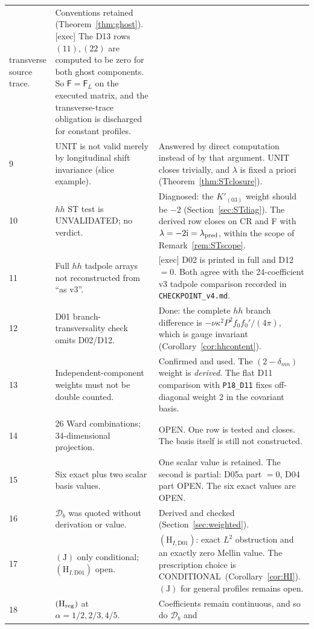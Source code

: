 \documentclass[11pt,a4paper]{article}
\newcommand{\ka}{\kappa}
\newcommand{\ii}{\mathrm i}
\newcommand{\Hreg}{(\mathrm H_{\rm reg})}
\newcommand{\Jcond}{(\mathrm J)}
\newcommand{\loc}[1]{\nolinkurl{#1}}
\newcommand{\OPEN}{\textsf{OPEN}}
\newcommand{\CONDITIONAL}{\textsf{CONDITIONAL}}
\newcommand{\UNVALIDATED}{\textsf{UNVALIDATED}}
\theoremstyle{plain}
\theoremstyle{definition}
\theoremstyle{remark}
\numberwithin{equation}{section}
\begin{document}
\begin{longtable}{@{}L{.035\linewidth}L{.36\linewidth}L{.54\linewidth}@{}}
transverse source trace. &
Conventions retained (Theorem~\ref{thm:ghost}).
\textsf{[exec]} The D13 rows \((11),(22)\) are computed to be zero
for both ghost components. So \(\mathsf F=\mathsf F_L\) on the
executed matrix, and the transverse-trace obligation is discharged
for constant profiles.\\
9 & UNIT is not valid merely by longitudinal shift invariance
(slice example). &
Answered by direct computation instead of by that argument.
UNIT closes trivially, and \(\lambda\) is fixed a priori
(Theorem~\ref{thm:STclosure}).\\
10 & \(hh\) ST test is \UNVALIDATED; no verdict. &
Diagnosed: the \(K'_{(03)}\) weight should be \(-2\)
(Section~\ref{sec:STdiag}).
The derived row closes on CR and F with
\(\lambda=-2\ii=\lambda_{\rm pred}\), within the scope of
Remark~\ref{rem:STscope}.\\
11 & Full \(hh\) tadpole arrays not reconstructed from
``as v3''. &
\textsf{[exec]} D02 is printed in full and D12 \(=0\).
Both agree with the 24-coefficient v3 tadpole comparison recorded in
\loc{CHECKPOINT_v4.md}.\\
12 & D01 branch-transversality check omits D02/D12. &
Done: the complete \(hh\) branch difference is
\(-\nu\ka^2P^2f_0f_0'/(4\pi)\), which is gauge invariant
(Corollary~\ref{cor:hhcontent}).\\
13 & Independent-component weights must not be double counted. &
Confirmed and used. The \((2-\delta_{mn})\) weight is
\emph{derived}.
The flat D11 comparison with \texttt{P18\_D11} fixes off-diagonal
weight 2 in the covariant basis.\\
14 & 26 Ward combinations; 34-dimensional projection. &
\OPEN. One row is tested and closes.
The basis itself is still not constructed.\\
15 & Six exact plus two scalar basis values. &
One scalar value is retained.
The second is partial: D05a part \(=0\), D04 part \OPEN.
The six exact values are \OPEN.\\
16 & \(\mathcal D_b\) was quoted without derivation or value. &
Derived and checked (Section~\ref{sec:weighted}).\\
17 & \(\Jcond\) only conditional; \((\mathrm H_{I,\mathrm{D01}})\)
open. &
\((\mathrm H_{I,\mathrm{D01}})\): exact \(L^2\) obstruction and an
exactly zero Mellin value. The prescription choice is
\CONDITIONAL\ (Corollary~\ref{cor:HI}).
\(\Jcond\) for general profiles remains open.\\
18 & \(\Hreg\) at \(\alpha=1/2,2/3,4/5\). &
Coefficients remain continuous, and so do \(\mathcal D_b\) and

\end{longtable}
\end{document}
